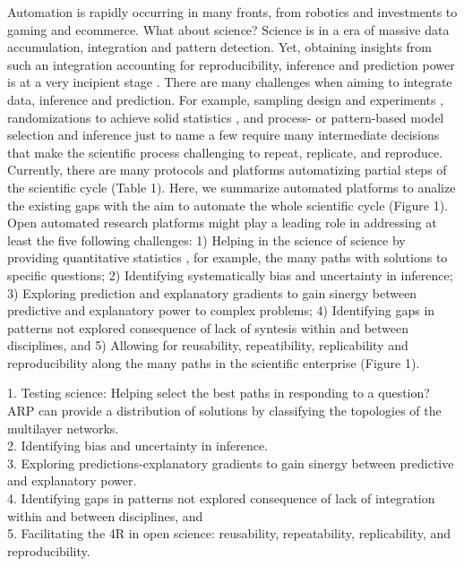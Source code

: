 \documentclass[english,12pt]{article}
\begin{document}
Automation is rapidly occurring in many fronts, from robotics and
investments to gaming and ecommerce. What about science? Science is in
a era of massive data accumulation, integration and pattern
detection. Yet, obtaining insights from such an integration accounting
for reproducibility, inference and prediction power is at a very
incipient stage \citep{Ioannidis2005,Reichsteietal2019}. There are
many challenges when aiming to integrate data, inference and
prediction. For example, sampling design and experiments  \citep{Voelkl2018}, randomizations to achieve solid
statistics , and process- or pattern-based
model selection and inference  just to name a
few require many intermediate decisions that make the scientific
process challenging to repeat, replicate, and reproduce. Currently,
there are many protocols and platforms automatizing partial steps of
the scientific cycle (Table 1). Here, we summarize automated platforms
to analize the existing gaps with the aim to automate the whole
scientific cycle (Figure 1). Open automated research platforms
 might play a leading role in
addressing at least the five following challenges: 1) Helping in the
science of science by providing quantitative statistics
\citep{Fortunatoeaao0185}, for example, the many paths with solutions
to specific questions; 2) Identifying systematically bias and
uncertainty in inference; 3) Exploring prediction and explanatory
gradients to gain sinergy between predictive and explanatory power to
complex problems; 4) Identifying gaps in patterns not explored
consequence of lack of syntesis within and between disciplines, and 5)
Allowing for reusability, repeatibility, replicability and
reproducibility along the many paths in the scientific enterprise
(Figure 1).

1. Testing science: Helping select the best paths in responding to a question? ARP can provide a distribution of solutions by classifying the topologies of the multilayer networks. \\
2. Identifying bias and uncertainty in inference. \\
3. Exploring predictions-explanatory gradients to gain sinergy between predictive and explanatory power. \\
4. Identifying gaps in patterns not explored consequence of lack of integration within and between disciplines, and \\
5. Facilitating the 4R in open science: reusability, repeatability, replicability, and reproducibility. \\
\end{document}
